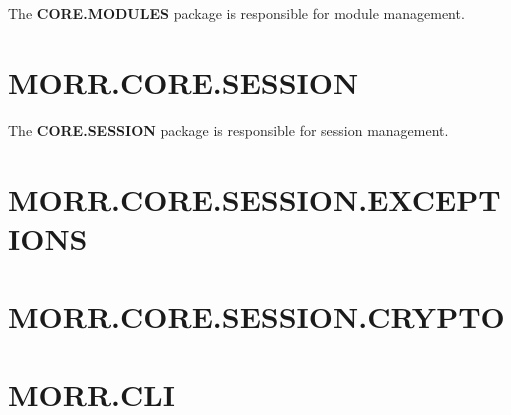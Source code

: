 The \textbf{CORE.MODULES} package is responsible for module management.

\begin{packif}
\end{packif}

\begin{packclass}
\end{packclass}

\section*{MORR.CORE.SESSION}

The \textbf{CORE.SESSION} package is responsible for session management.

\begin{packif}
\end{packif}

\begin{packclass}
\end{packclass}

\begin{packpack}
\end{packpack}

\section*{MORR.CORE.SESSION.EXCEPTIONS}

\begin{packclass}
\end{packclass}

\section*{MORR.CORE.SESSION.CRYPTO}

\begin{packclass}
\end{packclass}

\newpage
\section{MORR.CLI}

